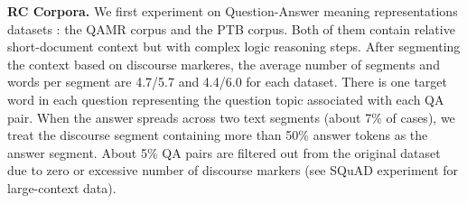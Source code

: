 \textbf{RC Corpora.}
We first experiment on Question-Answer meaning representations datasets \cite{DBLP:conf/naacl/MichaelSHDZ18}: the QAMR corpus and the PTB corpus. Both of them contain relative short-document context but with complex logic reasoning steps. After segmenting the context based on discourse markeres, the average number of segments and words per segment are 4.7/5.7 and 4.4/6.0 for each dataset.
There is one target word in each question representing the question topic associated with each QA pair. %
When the answer spreads across two text segments (about 7\% of cases), we treat the discourse segment containing more than 50\% answer tokens as the answer segment.
About 5\% QA pairs are filtered out from the original dataset due to zero or excessive number of discourse markers (see SQuAD experiment for large-context data).


